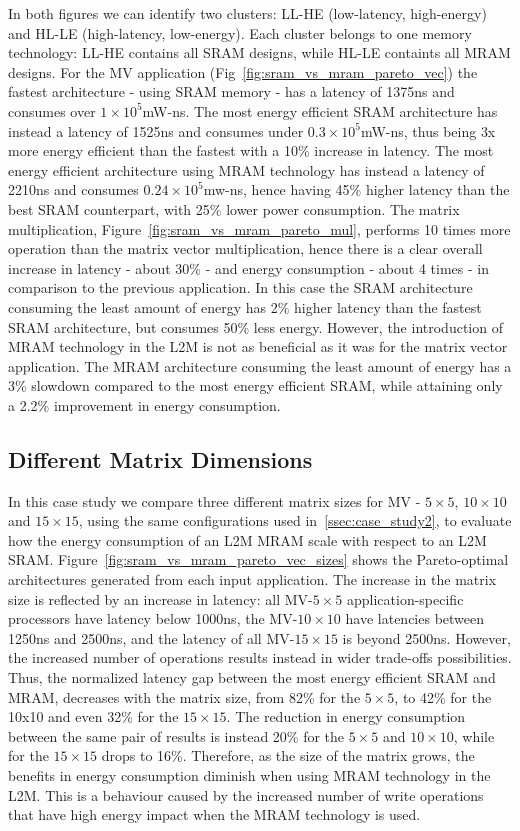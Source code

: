 In both figures we can identify two clusters: LL-HE (low-latency, high-energy) and HL-LE (high-latency, low-energy). Each cluster belongs to one memory technology: LL-HE contains all SRAM designs, while HL-LE containts all MRAM designs.
For the MV application (Fig~\ref{fig:sram_vs_mram_pareto_vec}) the fastest architecture - using SRAM memory - has a latency of 1375ns and consumes over $1\times10^5$mW-ns. The most energy efficient SRAM architecture has instead a latency of 1525ns and consumes under $0.3\times10^5$mW-ns, thus being 3x more energy efficient than the fastest with a 10\% increase in latency. The most energy efficient architecture using MRAM technology has instead a latency of 2210ns and consumes $0.24\times10^5$mw-ns, hence having 45\% higher latency than the best SRAM counterpart, with 25\% lower power consumption. The matrix multiplication, Figure~\ref{fig:sram_vs_mram_pareto_mul}, performs 10 times more operation than the matrix vector multiplication, hence there is a clear overall increase in latency - about 30\% - and energy consumption - about 4 times -  in comparison to the previous application. In this case the SRAM architecture consuming the least amount of energy has 2\% higher latency than the fastest SRAM architecture, but consumes 50\% less energy. However, the introduction of MRAM technology in the L2M is not as beneficial as it was for the matrix vector application. The MRAM architecture consuming the least amount of energy has a 3\% slowdown compared to the most energy efficient SRAM, while attaining only a 2.2\% improvement in energy consumption.


\subsection{Different Matrix Dimensions}
\label{ssec:case_study3}
In this case study we compare three different matrix sizes for MV - $5\times5$, $10\times10$ and $15\times15$, using the same configurations used in~\ref{ssec:case_study2}, to evaluate how the energy consumption of an L2M MRAM scale with respect to an L2M SRAM. Figure~\ref{fig:sram_vs_mram_pareto_vec_sizes} shows the Pareto-optimal architectures generated from each input application. The increase in the matrix size is reflected by an increase in latency: all MV-$5\times5$ application-specific processors have latency below 1000ns, the MV-$10\times10$ have latencies between 1250ns and 2500ns, and the latency of all MV-$15\times15$ is beyond 2500ns.
However, the increased number of operations results instead in wider trade-offs possibilities. Thus, the normalized latency gap between the most energy efficient SRAM and MRAM, decreases with the matrix size, from 82\% for the $5\times5$, to 42\% for the 10x10 and even 32\% for the $15\times15$. The reduction in energy consumption between the same pair of results is instead 20\% for the $5\times5$ and $10\times10$, while for the $15\times15$ drops to 16\%. Therefore, as the size of the matrix grows, the benefits in energy consumption diminish when using MRAM technology in the L2M. This is a behaviour caused by the increased number of write operations that have high energy impact when the MRAM technology is used.



